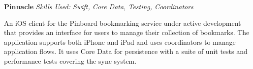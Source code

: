 \textbf{Pinnacle}  \newline
\textit{Skills Used: Swift, Core Data, Testing, Coordinators}

An iOS client for the Pinboard bookmarking service under active development that
provides an interface for users to manage their collection of bookmarks. The
application supports both iPhone and iPad and uses coordinators to manage
application flows. It uses Core Data for persistence with a suite of unit tests
and performance tests covering the sync system.

